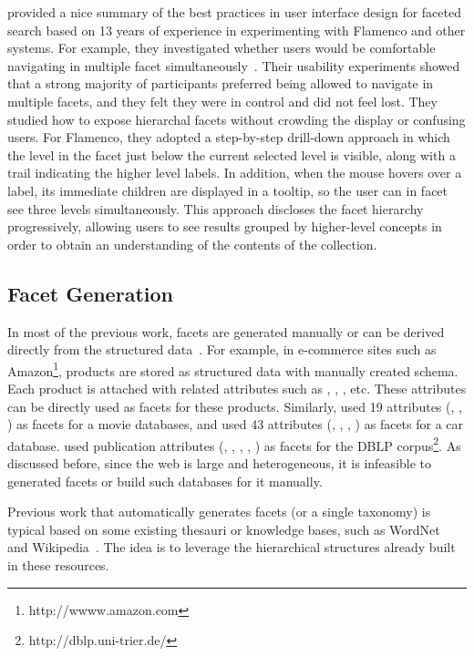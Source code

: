 \citet{hearst2006design} provided a nice summary of the best practices in user interface design for faceted search based on 13 years of experience in experimenting with Flamenco and other systems. For example, they investigated whether users would be comfortable navigating in multiple facet simultaneously~\cite{english2002hierarchical}. Their usability experiments showed that a strong majority of participants preferred being allowed to navigate in multiple facets, and they felt they were in control and did not feel lost. They studied how to expose hierarchal facets without crowding the display or confusing users. For Flamenco, they adopted a step-by-step drill-down approach in which the level in the facet just below the current selected level is visible, along with a trail indicating the higher level labels. In addition, when the mouse hovers over a label, its immediate children are displayed in a tooltip, so the user can in facet see three levels simultaneously. This approach discloses the facet hierarchy progressively, allowing users to see results grouped by higher-level concepts in order to obtain an understanding of the contents of the collection.


\subsection{Facet Generation}
In most of the previous work, facets are generated manually or can be derived directly from the structured data~\cite{basu2008minimum,yee2003faceted,dash2008dynamic,ben2008beyond}. For example, in e-commerce sites such as Amazon\footnote{http://wwww.amazon.com}, products are stored as structured data with manually created schema. Each product is attached with related attributes such as , , , etc. These attributes can be directly used as facets for these products. Similarly, \citet{basu2008minimum} used 19 attributes (\eg, , ) as facets for a movie databases, and used 43 attributes (\eg, , , ) as facets for a car database. \citet{dash2008dynamic} used publication attributes (\eg, , , , ) as facets for the DBLP corpus\footnote{http://dblp.uni-trier.de/}. As discussed before, since the web is large and heterogeneous, it is infeasible to generated facets or build such databases for it manually.

Previous work that automatically generates facets (or a single taxonomy) is typical based on some existing thesauri or knowledge bases, such as WordNet~\cite{stoica2007automating,dakka2005automatic,dakka2008automatic,latha2010afgf} and Wikipedia~\cite{dakka2008automatic,li2010facetedpedia,kohlschutter2006using}. The idea is to leverage the hierarchical structures already built in these resources.

